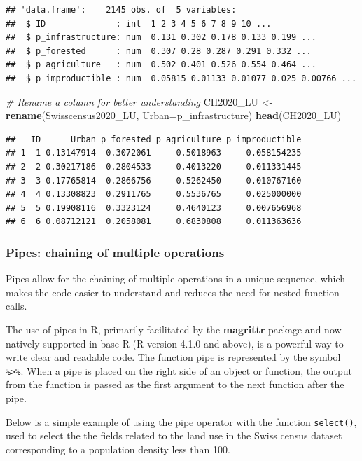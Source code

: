 \documentclass[
]{article}
\newenvironment{Shaded}{\begin{snugshade}}{\end{snugshade}}
\newcommand{\AttributeTok}[1]{\textcolor[rgb]{0.13,0.29,0.53}{#1}}
\newcommand{\CommentTok}[1]{\textcolor[rgb]{0.56,0.35,0.01}{\textit{#1}}}
\newcommand{\FunctionTok}[1]{\textcolor[rgb]{0.13,0.29,0.53}{\textbf{#1}}}
\newcommand{\NormalTok}[1]{#1}
\newcommand{\OtherTok}[1]{\textcolor[rgb]{0.56,0.35,0.01}{#1}}
\begin{document}
\begin{verbatim}
## 'data.frame':    2145 obs. of  5 variables:
##  $ ID              : int  1 2 3 4 5 6 7 8 9 10 ...
##  $ p_infrastructure: num  0.131 0.302 0.178 0.133 0.199 ...
##  $ p_forested      : num  0.307 0.28 0.287 0.291 0.332 ...
##  $ p_agriculture   : num  0.502 0.401 0.526 0.554 0.464 ...
##  $ p_improductible : num  0.05815 0.01133 0.01077 0.025 0.00766 ...
\end{verbatim}

\begin{Shaded}
\begin{Highlighting}[]
\CommentTok{\# Rename a column for better understanding}
\NormalTok{CH2020\_LU }\OtherTok{\textless{}{-}} \FunctionTok{rename}\NormalTok{(Swisscensus2020\_LU, }\AttributeTok{Urban=}\NormalTok{p\_infrastructure)}
\FunctionTok{head}\NormalTok{(CH2020\_LU)}
\end{Highlighting}
\end{Shaded}

\begin{verbatim}
##   ID      Urban p_forested p_agriculture p_improductible
## 1  1 0.13147914  0.3072061     0.5018963     0.058154235
## 2  2 0.30217186  0.2804533     0.4013220     0.011331445
## 3  3 0.17765814  0.2866756     0.5262450     0.010767160
## 4  4 0.13308823  0.2911765     0.5536765     0.025000000
## 5  5 0.19908116  0.3323124     0.4640123     0.007656968
## 6  6 0.08712121  0.2058081     0.6830808     0.011363636
\end{verbatim}

\subsubsection{Pipes: chaining of multiple operations}\label{pipes-chaining-of-multiple-operations}

Pipes allow for the chaining of multiple operations in a unique sequence, which makes the code easier to understand and reduces the need for nested function calls.

The use of pipes in R, primarily facilitated by the \textbf{magrittr} package and now natively supported in base R (R version 4.1.0 and above), is a powerful way to write clear and readable code. The function pipe is represented by the symbol \texttt{\%\textgreater{}\%}. When a pipe is placed on the right side of an object or function, the output from the function is passed as the first argument to the next function after the pipe.

Below is a simple example of using the pipe operator with the function \texttt{select()}, used to select the the fields related to the land use in the Swiss census dataset corresponding to a population density less than 100.
\end{document}
